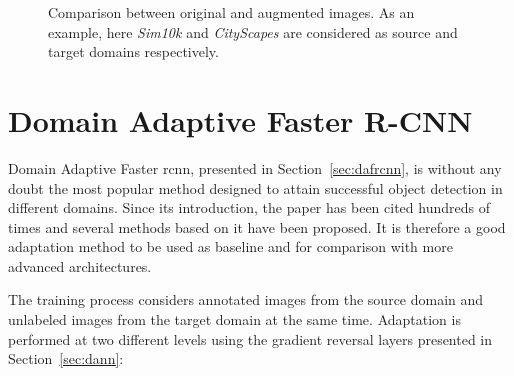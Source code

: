 \documentclass[%
    corpo=12pt,
    twoside,
    stile=classica,   
    tipotesi=magistrale,
    evenboxes,
    english
]{toptesi}
\begin{document}
\begin{figure}[ht]
	\centering
	\caption{Comparison between original and augmented images. As an example, here \textit{Sim10k} and \textit{CityScapes} are considered as source and target domains respectively.}
	\label{fig:augs}
\end{figure}


\section{Domain Adaptive Faster R-CNN}
Domain Adaptive Faster \acrshort{rcnn}\cite{chen2018domain}, presented in Section~\ref{sec:dafrcnn}, is without any doubt the most popular method designed to attain successful object detection in different domains. Since its introduction, the paper has been cited hundreds of times and several methods based on it have been proposed. It is therefore a good adaptation method to be used as baseline and for comparison with more advanced architectures.

The training process considers annotated images from the source domain and unlabeled images from the target domain at the same time. Adaptation is performed at two different levels  using the gradient reversal layers presented in Section~\ref{sec:dann}:
\end{document}
